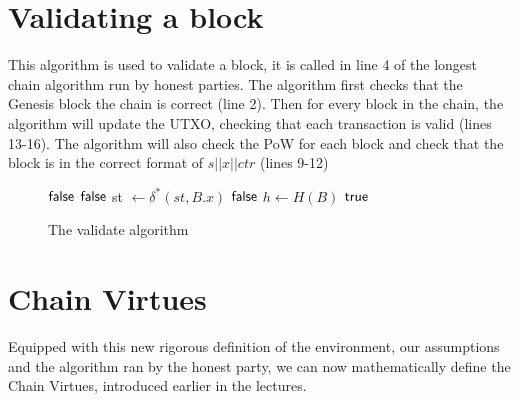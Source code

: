 \section{Validating a block}
This algorithm is used to validate a block, it is called in line 4 of the longest chain algorithm run by honest parties. The algorithm first checks that the Genesis block the chain is correct (line 2). Then for every block in the chain, the algorithm will update the UTXO, checking that each transaction is valid (lines 13-16). The algorithm will also check the PoW for each block and check that the block is in the correct format of $s || x || ctr$ (lines 9-12)
\begin{figure}[H]
\begin{algorithm}[H]
    \caption{\label{alg.validate} The validate algorithm}
    \begin{algorithmic}[1]
         
            \State\Return$\textsf{false}$
        \EndIf
         
             
                \State\Return$\textsf{false}$
            \EndIf
            \State st $\leftarrow \delta^*(st, B.x)$ 
                \State\Return$\textsf{false}$
            \EndIf
            \State $h \leftarrow H(B)$
        \EndFor
        \State\Return$\textsf{true}$
    \EndFunction
    \end{algorithmic}
\end{algorithm}
\end{figure}


\section{Chain Virtues}
Equipped with this new rigorous definition of the environment, our assumptions and the algorithm ran by the honest party, we can now mathematically define the Chain Virtues, introduced earlier in the lectures.

